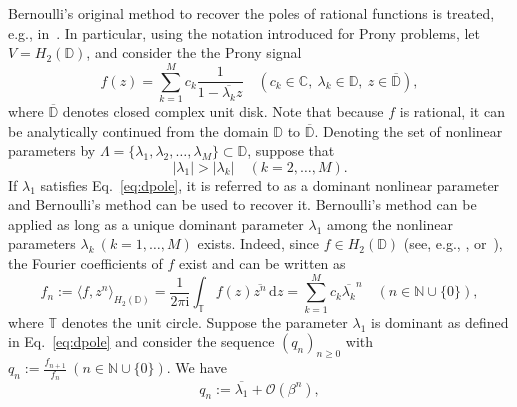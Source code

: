 \documentclass{arxiv}
\newcommand{\ri}{\mathrm{i}}
\renewcommand{\d}{\mathrm{d}}
\begin{document}
Bernoulli's original method to recover the poles of rational functions is treated, e.g.,  in~\cite{HEN93}. In particular, using the notation introduced for Prony problems, let $V=H_2(\mathbb{D})$, and consider the the Prony signal
\begin{equation}
    f(z) = \sum_{k=1}^M c_k  \frac{1}{1 - \overline{\lambda_k}z} \quad (c_k \in \mathbb{C}, \ \lambda_k \in \mathbb{D}, \ z \in \overline{\mathbb{D}}),
\end{equation}
where $\overline{\mathbb{D}}$ denotes closed complex unit disk. Note that because $f$ is rational, it can be analytically continued from the domain $\mathbb{D}$ to $\overline{\mathbb{D}}$. Denoting the set of nonlinear parameters by $\Lambda = \{\lambda_1, \lambda_2, \ldots, \lambda_M \} \subset \mathbb{D}$, suppose that 
\begin{equation}
    \label{eq:dpole}
    |\lambda_{1}|>|\lambda_k| \quad (k=2, \ldots, M).
\end{equation}
If $\lambda_1$ satisfies Eq.~\eqref{eq:dpole}, it is referred to as a dominant nonlinear parameter and Bernoulli's method can be used to recover it. Bernoulli's method can be applied as long as a unique dominant parameter $\lambda_1$ among the nonlinear parameters $\lambda_k \ (k=1,\ldots,M)$ exists. Indeed, since $f \in H_2(\mathbb{D})$ (see, e.g., \cite[Eq.~(2.10)]{siamdozsa}, or~\cite[Prop.~12.3.4 (b)]{bprodbook}), the Fourier coefficients of $f$ exist and can be written as
\begin{equation}
    \label{eq:fcoeff}
    f_n := \langle f, z^n \rangle_{H_2(\mathbb{D})} = \frac{1}{2 \pi \ri} \int_{\mathbb{T}} f(z) \overline{z^n}\, \d z = \sum_{k=1}^M c_k \overline{\lambda_k}^n \quad (n \in \mathbb{N} \cup \{0\}),
\end{equation}
where $\mathbb{T}$ denotes the unit circle.
Suppose the parameter $\lambda_1$ is dominant as defined in Eq.~\eqref{eq:dpole} and consider the sequence ${(q_n)}_{n \ge 0}$ with $q_n := \frac{f_{n+1}}{f_n} \ (n \in \mathbb{N} \cup \{0\})$. We have
\begin{equation}
    \label{eq:BernOrig}
    q_n := \overline{\lambda_1} + \mathcal{O}(\beta^{n}),
\end{equation}
\end{document}
